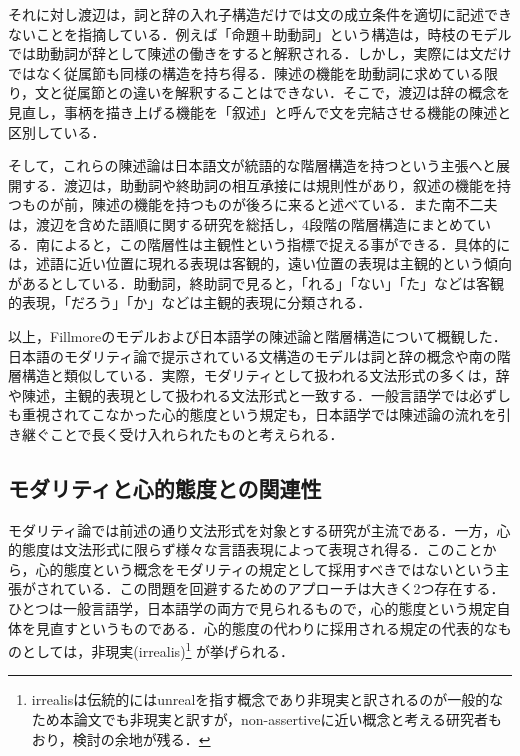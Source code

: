 \documentclass[japanese]{jnlp_1.4}
\begin{document}
それに対し渡辺は，詞と辞の入れ子構造だけでは文の成立条件を適切に記述できないことを指摘している\cite{Book_23,Book_18}．例えば「命題＋助動詞」という構造は，時枝のモデルでは助動詞が辞として陳述の働きをすると解釈される．しかし，実際には文だけではなく従属節も同様の構造を持ち得る．陳述の機能を助動詞に求めている限り，文と従属節との違いを解釈することはできない．そこで，渡辺は辞の概念を見直し，事柄を描き上げる機能を「叙述」と呼んで文を完結させる機能の陳述と区別している．

そして，これらの陳述論は日本語文が統語的な階層構造を持つという主張へと展開する．渡辺は，助動詞や終助詞の相互承接には規則性があり，叙述の機能を持つものが前，陳述の機能を持つものが後ろに来ると述べている．また南不二夫は，渡辺を含めた語順に関する研究を総括し，4段階の階層構造にまとめている\cite{Book_20,Book_10}．南によると，この階層性は主観性という指標で捉える事ができる．具体的には，述語に近い位置に現れる表現は客観的，遠い位置の表現は主観的という傾向があるとしている．助動詞，終助詞で見ると，「れる」「ない」「た」などは客観的表現，「だろう」「か」などは主観的表現に分類される．

以上，Fillmoreのモデルおよび日本語学の陳述論と階層構造について概観した．日本語のモダリティ論で提示されている文構造のモデルは詞と辞の概念や南の階層構造と類似している．実際，モダリティとして扱われる文法形式の多くは，辞や陳述，主観的表現として扱われる文法形式と一致する．一般言語学では必ずしも重視されてこなかった心的態度という規定も，日本語学では陳述論の流れを引き継ぐことで長く受け入れられたものと考えられる．



\subsection{モダリティと心的態度との関連性}

モダリティ論では前述の通り文法形式を対象とする研究が主流である．一方，心的態度は文法形式に限らず様々な言語表現によって表現され得る．このことから，心的態度という概念をモダリティの規定として採用すべきではないという主張がされている\cite{Book_06,Article_04}．この問題を回避するためのアプローチは大きく2つ存在する．ひとつは一般言語学，日本語学の両方で見られるもので，心的態度という規定自体を見直すというものである．心的態度の代わりに採用される規定の代表的なものとしては，非現実(irrealis)\footnote{irrealisは伝統的にはunrealを指す概念であり非現実と訳されるのが一般的なため本論文でも非現実と訳すが，non-assertiveに近い概念と考える研究者もおり\cite{Book_07}，検討の余地が残る．} が挙げられる\cite{Book_07,Book_06,Article_04}．
\end{document}
